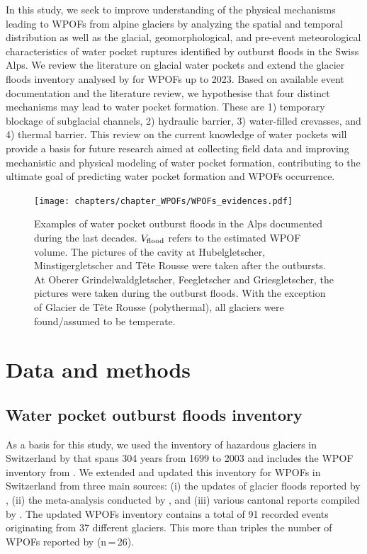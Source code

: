 In this study, we seek to improve understanding of the physical mechanisms leading to WPOFs from alpine glaciers by analyzing the spatial and temporal distribution as well as the glacial, geomorphological, and pre-event meteorological characteristics of water pocket ruptures identified by outburst floods in the Swiss Alps. We review the literature on glacial water pockets and extend the glacier floods inventory analysed by \citet{Haeberli1983} for WPOFs up to 2023. Based on available event documentation and the literature review, we hypothesise that four distinct mechanisms may lead to water pocket formation. These are 1) temporary blockage of subglacial channels, 2) hydraulic barrier, 3) water-filled crevasses, and 4) thermal barrier. This review on the current knowledge of water pockets will provide a basis for future research aimed at collecting field data and improving mechanistic and physical modeling of water pocket formation, contributing to the ultimate goal of predicting water pocket formation and WPOFs occurrence.

    \begin{figure}
    \centering
    \texttt{[image: chapters/chapter\_WPOFs/WPOFs\_evidences.pdf]}
    \caption{Examples of water pocket outburst floods in the Alps documented during the last decades. $V_{\rm{flood}}$ refers to the estimated WPOF volume. The pictures of the cavity at Hubelgletscher, Minstigergletscher and Tête Rousse were taken after the outbursts. At Oberer Grindelwaldgletscher, Feegletscher and Griesgletscher, the pictures were taken during the outburst floods. With the exception of Glacier de Tête Rousse (polythermal), all glaciers were found/assumed to be temperate.}
    \label{fig:WPOFs_evidences}
\end{figure}

\section{ Data and methods}


\subsection{ Water pocket outburst floods inventory}

As a basis for this study, we used the inventory of hazardous glaciers in Switzerland by \cite{Raymond&al2003} that spans 304 years from 1699 to 2003 and includes the WPOF inventory from \cite{Haeberli1983}. We extended and updated this inventory for WPOFs in Switzerland from three main sources: (i) the updates of glacier floods reported by \cite{GLAMOS_reports2022}, (ii) the meta-analysis conducted by \cite{Veh&al2022}, and (iii) various cantonal reports compiled by \citet{Lanz2022}. The updated WPOFs inventory contains a total of 91 recorded events originating from 37 different glaciers. This more than triples the number of WPOFs reported by \citet{Haeberli1983} (n\,=\,26). 

